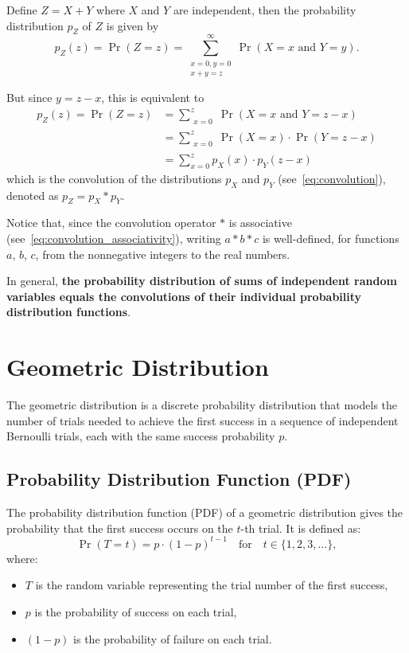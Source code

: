 \documentclass{masterthesis}
\begin{document}
Define $Z = X+Y$ where $X$ and $Y$ are independent, then the probability distribution $p_Z$ of $Z$ is given by 
\begin{equation}
    p_Z(z) = \Pr(Z = z) = \sum_{\substack{x=0, y=0 \\ x+y=z}}^{\infty} \Pr(X = x \text{ and } Y = y).
\end{equation}

But since $y = z - x$, this is equivalent to
\begin{align}
    p_Z(z) = \Pr(Z = z) &= \sum_{\substack{x=0}}^{z} \Pr(X = x \text{ and } Y = z - x) \\ 
                        &= \sum_{\substack{x=0}}^{z} \Pr(X = x) \cdot \Pr(Y = z - x) \\
                        &= \sum_{x=0}^{z} p_X(x) \cdot p_Y (z - x)
\end{align}
which is the convolution of the distributions $p_X$ and $p_Y$ (see~\ref{eq:convolution}), denoted as $p_Z = p_X * p_Y$.

Notice that, since the convolution operator $*$ is associative (see~\ref{eq:convolution_associativity}), writing $a * b * c$ is well-defined, for functions $a$, $b$, $c$, from the nonnegative integers to the real numbers.

In general, \textbf{the probability distribution of sums of independent random variables equals the convolutions of their individual probability distribution functions}.

\section{Geometric Distribution}\label{section:geometric_distribution}

The geometric distribution is a discrete probability distribution that models the number of trials needed to achieve the first success in a sequence of independent Bernoulli trials, each with the same success probability $p$.

\subsection{Probability Distribution Function (PDF)}\label{subsection:geometric_pdf}

The probability distribution function (PDF) of a geometric distribution gives the probability that the first success occurs on the $t$-th trial. It is defined as:
\begin{equation}
    \Pr(T = t) = p \cdot (1 - p)^{t-1} \quad \text{for} \quad t \in \{1, 2, 3, \ldots \},
\end{equation}
where:
\begin{itemize}
    \item $T$ is the random variable representing the trial number of the first success,
    \item $p$ is the probability of success on each trial,
    \item $(1 - p)$ is the probability of failure on each trial.
\end{itemize}
\end{document}
